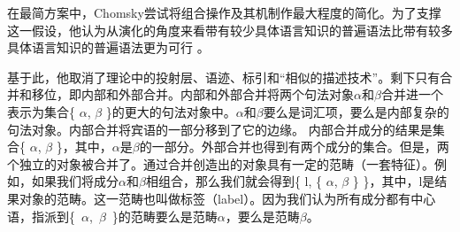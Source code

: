 在最简方案中，Chomsky尝试将组合操作及其机制作最大程度的简化。为了支撑这一假设，他认为从演化的角度来看带有较少具体语言知识的普遍语法比带有较多具体语言知识的普遍语法更为可行 \citep[]{Chomsky2008a}。

基于此，他取消了\xbarc 理论中的投射层、语迹、标引和“相似的描述技术”\citep[]{Chomsky2008a}。剩下只有合并和移位，即内部和外部合并。内部和外部合并将两个句法对象$\alpha$和$\beta$合并进一个表示为集合\{ $\alpha$, $\beta$ \}的更大的句法对象中。$\alpha$和$\beta$要么是词汇项，要么是内部复杂的句法对象。内部合并将宾语的一部分移到了它的边缘。 内部合并成分的结果是集合\{ $\alpha$, $\beta$ \}，其中，$\alpha$是$\beta$的一部分。外部合并也得到有两个成分的集合。但是，两个独立的对象被合并了。通过合并创造出的对象具有一定的范畴（一套特征）。例如，如果我们将成分$\alpha$和$\beta$相组合，那么我们就会得到\{ l, \{ $\alpha$, $\beta$ \} \}，其中，l是结果对象的范畴。这一范畴也叫做标签（label）。因为我们认为所有成分都有中心语，指派到\{~$\alpha$,~$\beta$~\}的范畴要么是范畴$\alpha$，要么是范畴$\beta$。
